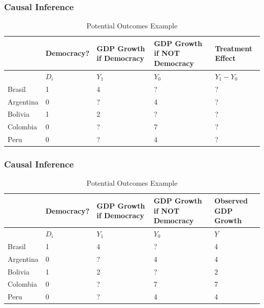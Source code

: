 \documentclass[xcolor=x11names,compress]{beamer}\usepackage[]{graphicx}\usepackage[]{color}
\renewcommand{\(}{\begin{columns}}
\renewcommand{\)}{\end{columns}}
\newcommand{\<}[1]{\begin{column}{#1}}
\renewcommand{\>}{\end{column}}
\begin{document}
\begin{frame}
\frametitle{Causal Inference}
\footnotesize
\begin{table}[htbp]
  \centering
  \caption{Potential Outcomes Example}
    \begin{tabular}{|p{1.8cm}|p{1.8cm}|p{2cm}|p{2cm}|p{2cm}|}
    \hline
          & \multicolumn{1}{p{1.8cm}|}{Democracy?} & \multicolumn{1}{p{2cm}|}{GDP Growth if Democracy} & \multicolumn{1}{p{2.2cm}|}{GDP Growth if NOT Democracy} & Treatment Effect \bigstrut\\
    \hline
          & \multicolumn{1}{p{1.8cm}|}{$D_i$} & \multicolumn{1}{p{2cm}|}{$Y_1$} & \multicolumn{1}{p{2.2cm}|}{$Y_0$} & \multicolumn{1}{p{1.8cm}|}{$Y_{1} - Y_{0}$} \bigstrut\\
    \hline
    Brasil & 1 & 4     & ?      & ? \bigstrut\\
    \hline
    Argentina & 0 & ?    & 4      & ? \bigstrut\\
    \hline
    Bolivia & 1 & 2     & ?     & ? \bigstrut\\
    \hline
    Colombia & 0 &  ?   & 7    & ? \bigstrut\\
    \hline
    Peru & 0 & ?     & 4     & ? \bigstrut\\
\hline
    \end{tabular}%
  \label{tab:addlabel}%
\end{table}%
\normalsize
\end{frame}

\begin{frame}
\frametitle{Causal Inference}
\footnotesize
\begin{table}[htbp]
  \centering
  \caption{Potential Outcomes Example}
    \begin{tabular}{|p{1.8cm}|p{1.8cm}|p{2cm}|p{2cm}|p{2cm}|}
    \hline
          & \multicolumn{1}{p{1.8cm}|}{Democracy?} & \multicolumn{1}{p{2cm}|}{GDP Growth if Democracy} & \multicolumn{1}{p{2.2cm}|}{GDP Growth if NOT Democracy} & \textbf{Observed} GDP Growth \bigstrut\\
    \hline
          & \multicolumn{1}{p{1.8cm}|}{$D_i$} & \multicolumn{1}{p{2cm}|}{$Y_1$} & \multicolumn{1}{p{2.2cm}|}{$Y_0$} & \multicolumn{1}{p{1.8cm}|}{$Y$} \bigstrut\\
    \hline
    Brasil & 1 & 4     & ?      & 4 \bigstrut\\
    \hline
    Argentina & 0 & ?    & 4      & 4 \bigstrut\\
    \hline
    Bolivia & 1 & 2     & ?     & 2 \bigstrut\\
    \hline
    Colombia & 0 &  ?   & 7    & 7 \bigstrut\\
    \hline
    Peru & 0 & ?     & 4     & 4 \bigstrut\\
    \hline
    \end{tabular}%
  \label{tab:addlabel}%
\end{table}%
\normalsize
\end{frame}
\end{document}
